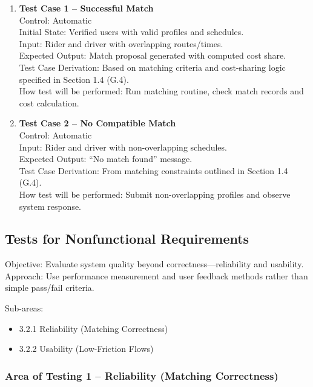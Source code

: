 \documentclass[12pt, titlepage]{article}
\begin{document}
\begin{enumerate}
\item \textbf{Test Case 1 – Successful Match}\\
Control: Automatic\\
Initial State: Verified users with valid profiles and schedules.\\
Input: Rider and driver with overlapping routes/times.\\
Expected Output: Match proposal generated with computed cost share.\\
Test Case Derivation: Based on matching criteria and cost-sharing logic specified in Section 1.4 (G.4).\\
How test will be performed: Run matching routine, check match records and cost calculation.\\[5pt]

\item \textbf{Test Case 2 – No Compatible Match}\\
Control: Automatic\\
Input: Rider and driver with non-overlapping schedules.\\
Expected Output: “No match found” message.\\
Test Case Derivation: From matching constraints outlined in Section 1.4 (G.4).\\
How test will be performed: Submit non-overlapping profiles and observe system response.\\
\end{enumerate}

\subsection{Tests for Nonfunctional Requirements}

Objective: Evaluate system quality beyond correctness—reliability and usability.  
Approach: Use performance measurement and user feedback methods rather than simple pass/fail criteria.

Sub-areas:
\begin{itemize}
    \item 3.2.1 Reliability (Matching Correctness)
    \item 3.2.2 Usability (Low-Friction Flows)
\end{itemize}

\subsubsection{Area of Testing 1 – Reliability (Matching Correctness)}
\end{document}
